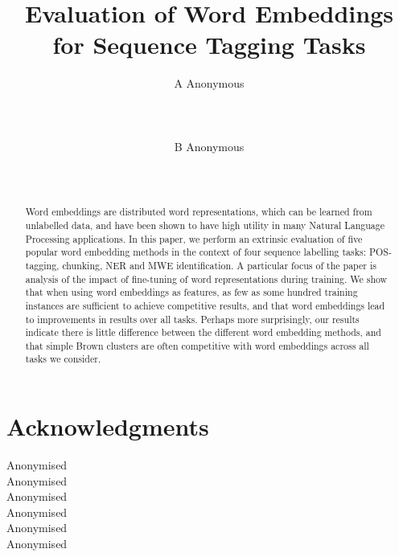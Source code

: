 \documentclass[11pt]{article}
\title{Evaluation of Word Embeddings for Sequence Tagging Tasks}
\author{A Anonymous 
   \\%
   \\ %
   \\ %
  \\ %
\And
  B Anonymous
   \\%
   \\%
   \\ %
}
\date{}
\begin{document}
\maketitle


\begin{abstract} 
  Word embeddings are distributed word representations, which can be
  learned from unlabelled data, and have been shown to have high utility
  in many Natural Language Processing applications. 
  In this paper, we perform an extrinsic evaluation of five popular word
  embedding methods in the context of four sequence labelling tasks:
  POS-tagging, chunking, NER and MWE identification.
  A particular focus of the paper is analysis of the impact of fine-tuning of word
  representations during training.
  We show that when using word embeddings as features, as few as
  some hundred training instances are sufficient to achieve competitive
  results, and that word embeddings lead to improvements in results over
  all tasks.
  Perhaps more surprisingly, our results indicate there is 
  little difference between the different word embedding methods, and that simple Brown 			clusters are often competitive with word
  embeddings across all tasks we consider. 
\end{abstract}

\newcommand{\gabi}[1]{\textcolor{blue}{#1}}
\newcommand{\tim}[1]{\textcolor{red}{#1}}
\newcommand{\lizhen}[1]{\textcolor{green}{#1}}
\newcommand{\nss}[1]{\textcolor{magenta}{#1}}








\section*{Acknowledgments}

Anonymised\\
Anonymised\\
Anonymised\\
Anonymised\\
Anonymised\\
Anonymised\\




\end{document}
